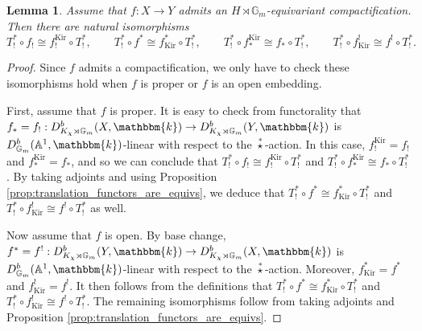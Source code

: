 \documentclass{amsart}
\newcommand{\A}{\mathbb{A}}
\newcommand{\G}{\mathbb{G}}
\renewcommand{\k}{\mathbbm{k}}
\DeclareMathOperator{\Kir}{Kir}
\newcommand{\sstar}{\stackrel{*}{\star}}
\newtheorem{lemma}[subsubsection]{Lemma}
\theoremstyle{definition}
\begin{document}
    \begin{lemma}\label{lem:translation_and_sh_functors}
        Assume that $f : X \to Y$ admits an $H \rtimes \G_m$-equivariant compactification. Then there are natural isomorphisms
         \[T_!^* \circ f_! \cong f_!^{\Kir} \circ T_!^*, \qquad T_!^* \circ f^* \cong f_{\Kir}^* \circ T_!^*, \qquad T_!^* \circ f_*^{\Kir} \cong f_* \circ T_!^*, \qquad T_!^* \circ f_{\Kir}^! \cong f^! \circ T_!^*.\]
    \end{lemma}
    \begin{proof}
        Since $f$ admits a compactification, we only have to check these isomorphisms hold when $f$ is proper or $f$ is an open embedding. 

        First, assume that $f$ is proper. It is easy to check from functorality that $f_* = f_! : D_{K_{\chi} \rtimes \G_m}^b (X, \k) \to D_{K_{\chi} \rtimes \G_m}^b (Y, \k)$ is $D_{\G_m}^b (\A^1, \k)$-linear with respect to the $\sstar$-action.
        In this case, $f_!^{\Kir} = f_!$ and $f_*^{\Kir} = f_*$, and so we can conclude that $T_!^* \circ f_! \cong f_!^{\Kir} \circ T_!^*$ and $T_!^* \circ f_*^{\Kir} \cong f_* \circ T_!^*$.
        By taking adjoints and using Proposition \ref{prop:translation_functors_are_equivs}, we deduce that $T_!^* \circ f^* \cong f_{\Kir}^* \circ T_!^*$ and $T_!^* \circ f_{\Kir}^! \cong f^! \circ T_!^*$ as well.

        Now assume that $f$ is open. By base change, $f^* = f^! : D_{K_{\chi} \rtimes \G_m}^b (Y, \k) \to D_{K_{\chi} \rtimes \G_m}^b (X, \k)$ is $D_{\G_m}^b (\A^1, \k)$-linear with respect to the $\sstar$-action.
        Moreover, $f_{\Kir}^* = f^*$ and $f_{\Kir}^! = f^!$. It then follows from the definitions that $T_!^* \circ f^* \cong f_{\Kir}^* \circ T_!^*$ and $T_!^* \circ f_{\Kir}^! \cong f^! \circ T_!^*$.
        The remaining isomorphisms follow from taking adjoints and Proposition \ref{prop:translation_functors_are_equivs}.
    \end{proof}
\end{document}
